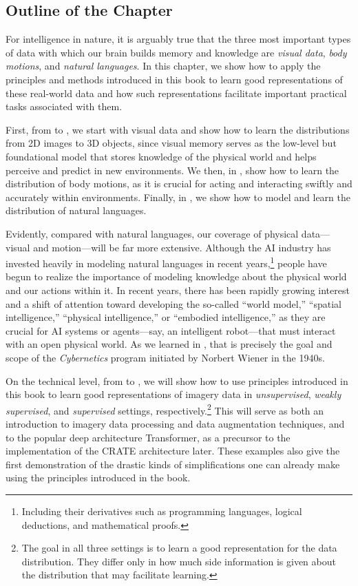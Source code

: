 \documentclass[../../book-main.tex]{subfiles}
\begin{document}
\subsection{Outline of the Chapter}
\label{sec:application_outline}
For intelligence in nature, it is arguably true that the three most
important types of data with which our brain builds memory and
knowledge are \textit{visual data}, \textit{body motions}, and \textit{natural languages}.
In this chapter, we show how to apply the principles and methods introduced in this book to learn good representations of these real-world data and how such representations facilitate important practical tasks associated with them.

First, from  to , we
start with visual data and show how to learn the distributions from 2D
images to 3D objects, since visual memory serves as the low-level but
foundational model that stores knowledge of the physical world and
helps perceive and predict in new environments. We then, in
, show how to learn the distribution of body motions,
as it is crucial for acting and interacting swiftly and accurately
within environments. Finally, in , we show how to
model and learn the distribution of natural languages.

Evidently, compared with natural languages, our coverage of
physical data---visual and motion---will be far more extensive.
Although the AI industry has invested heavily in modeling natural languages in recent years,\footnote{Including their derivatives such as programming languages, logical deductions, and mathematical proofs.} people have begun to realize the importance of modeling
knowledge about the physical world and our actions within it.
In recent years, there has been rapidly growing interest and a shift of attention toward developing the so-called ``world model,'' ``spatial intelligence,'' ``physical intelligence,'' or ``embodied intelligence,'' as they are crucial for AI systems or agents---say, an intelligent robot---that must interact with an open physical world.
As we learned in , that is precisely the goal and scope of the \textit{Cybernetics} program initiated by Norbert Wiener in the 1940s.

On the technical level, from  to
, we will show how to use principles
introduced in this book to learn good representations of imagery data
in \textit{unsupervised}, \textit{weakly supervised}, and \textit{supervised}
settings, respectively.\footnote{The goal in all three settings is to learn a good representation for the data distribution.
They differ only in how much side information is given about the distribution that may facilitate learning.} This will serve as both an introduction to imagery data processing and data augmentation techniques, and to the popular deep architecture Transformer, as a precursor to the implementation of the CRATE architecture later.
These examples also give the first demonstration of the drastic kinds of simplifications one can already make using the principles introduced in the book.
\end{document}
